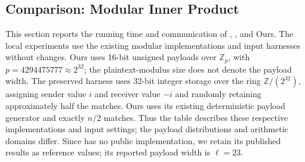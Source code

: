 \subsection{Comparison: Modular Inner Product}

\label{sec:performance-comparison}
This section reports the running time and communication of
\cite{CHI+23}, \cite{KLS26}, and Ours. The local experiments use the
existing modular implementations and input harnesses without changes.
Ours uses 16-bit unsigned payloads over $\mathbb{Z}_p$, with
$p=4294475777\approx 2^{32}$; the plaintext-modulus size does not denote
the payload width. The preserved \cite{KLS26} harness uses 32-bit integer
storage over the ring $\mathbb{Z}/(2^{32})$, assigning sender value $i$
and receiver value $-i$ and randomly retaining approximately half the
matches. Ours uses its existing deterministic payload generator and
exactly $n/2$ matches. Thus the table describes these respective
implementations and input settings; the payload distributions and
arithmetic domains differ. Since \cite{CHI+23} has no public
implementation, we retain its published results as reference values;
its reported payload width is $\ell=23$.




